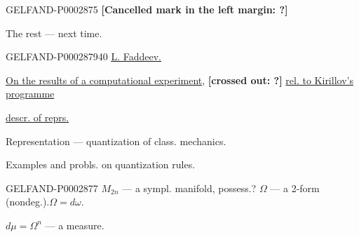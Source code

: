 \begin{GelfandAdjacentEvidence}{GELFAND-P000287}{5}
\textbf{[Cancelled mark in the left margin: ?]}

\end{GelfandAdjacentEvidence}


The rest --- next time.

\begin{GelfandAdjacentEvidence}{GELFAND-P000287}{940}
\underline{\underline{L. Faddeev.}}

\underline{On the results of a computational experiment}, \textbf{[crossed out: ?]} \underline{rel. to Kirillov’s programme}

\hfill\underline{descr. of reprs.}





\end{GelfandAdjacentEvidence}


Representation --- quantization of class. mechanics.

Examples and probls. on quantization rules.

\begin{GelfandAdjacentEvidence}{GELFAND-P000287}{7}
$M_{2n}$ --- a sympl. manifold, possess.? $\Omega$ --- a 2-form (nondeg.).\qquad $\Omega=d\omega$.

\end{GelfandAdjacentEvidence}


$d\mu=\Omega^n$ --- a measure.

